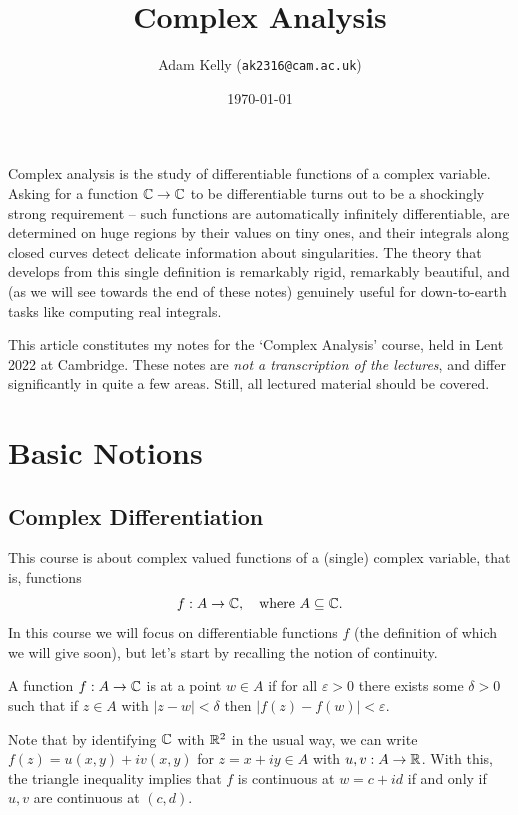 \documentclass[a4paper]{scrartcl}
\title{Complex Analysis}
\author{Adam Kelly (\texttt{ak2316@cam.ac.uk})}
\date{\today}
\begin{document}
\maketitle

Complex analysis is the study of differentiable functions of a complex variable. Asking for a function $\mathbb{C} \rightarrow \mathbb{C}$ to be differentiable turns out to be a shockingly strong requirement -- such functions are automatically infinitely differentiable, are determined on huge regions by their values on tiny ones, and their integrals along closed curves detect delicate information about singularities. The theory that develops from this single definition is remarkably rigid, remarkably beautiful, and (as we will see towards the end of these notes) genuinely useful for down-to-earth tasks like computing real integrals.

This article constitutes my notes for the `Complex Analysis' course, held in Lent 2022 at Cambridge. These notes are \emph{not a transcription of the lectures}, and differ significantly in quite a few areas. Still, all lectured material should be covered.



\tableofcontents


\section{Basic Notions}

\subsection{Complex Differentiation}

This course is about complex valued functions of a (single) complex variable, that is, functions
$$
f:A \rightarrow \mathbb{C}, \quad \text{where }A \subseteq \mathbb{C}.
$$
In this course we will focus on differentiable functions $f$ (the definition of which we will give soon), but let's start by recalling the notion of continuity.

\begin{definition}[Continuity]
    A function $f: A \rightarrow \mathbb{C}$ is  at a point $w \in A$ if for all $\varepsilon > 0$ there exists some $\delta > 0$ such that if $z \in A$ with $|z - w| < \delta$ then $|f(z) - f(w)| < \varepsilon$.
\end{definition}

Note that by identifying $\mathbb{C}$ with $\mathbb{R}^2$ in the usual way, we can write
$
f(z) = u(x, y) + iv(x, y)
$
for $z = x + iy \in A$ with $u, v: A \rightarrow \mathbb{R}$. With this, the triangle inequality implies that $f$ is continuous at $w = c + id$ if and only if $u, v$ are continuous at $(c, d)$.
\end{document}
